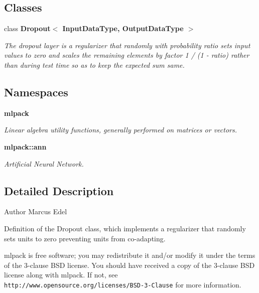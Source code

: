 \subsection*{Classes}
\begin{DoxyCompactItemize}
\item 
class \textbf{ Dropout$<$ Input\+Data\+Type, Output\+Data\+Type $>$}
\begin{DoxyCompactList}\small\item\em The dropout layer is a regularizer that randomly with probability \textquotesingle{}ratio\textquotesingle{} sets input values to zero and scales the remaining elements by factor 1 / (1 -\/ ratio) rather than during test time so as to keep the expected sum same. \end{DoxyCompactList}\end{DoxyCompactItemize}
\subsection*{Namespaces}
\begin{DoxyCompactItemize}
\item 
 \textbf{ mlpack}
\begin{DoxyCompactList}\small\item\em Linear algebra utility functions, generally performed on matrices or vectors. \end{DoxyCompactList}\item 
 \textbf{ mlpack\+::ann}
\begin{DoxyCompactList}\small\item\em Artificial Neural Network. \end{DoxyCompactList}\end{DoxyCompactItemize}


\subsection{Detailed Description}
\begin{DoxyAuthor}{Author}
Marcus Edel
\end{DoxyAuthor}
Definition of the Dropout class, which implements a regularizer that randomly sets units to zero preventing units from co-\/adapting.

mlpack is free software; you may redistribute it and/or modify it under the terms of the 3-\/clause B\+SD license. You should have received a copy of the 3-\/clause B\+SD license along with mlpack. If not, see {\tt http\+://www.\+opensource.\+org/licenses/\+B\+S\+D-\/3-\/\+Clause} for more information. 
